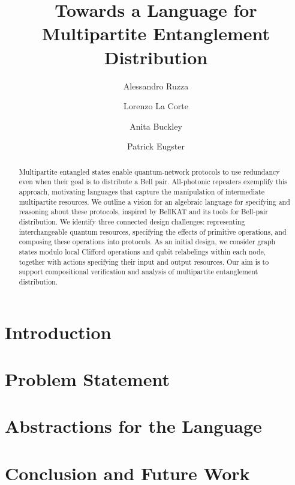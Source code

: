 \documentclass[acmsmall,11pt,screen,nonacm]{acmart}
\begin{document}
\title{Towards a Language for Multipartite Entanglement Distribution}

\author{Alessandro Ruzza}
\author{Lorenzo La Corte}
\author{Anita Buckley}
\author{Patrick Eugster}

\begin{abstract}
Multipartite entangled states enable quantum-network protocols to use redundancy even when their goal is to distribute a Bell pair. All-photonic repeaters exemplify this approach, motivating languages that capture the manipulation of intermediate multipartite resources. We outline a vision for an algebraic language for specifying and reasoning about these protocols, inspired by BellKAT and its tools for Bell-pair distribution. We identify three connected design challenges: representing interchangeable quantum resources, specifying the effects of primitive operations, and composing these operations into protocols. As an initial design, we consider graph states modulo local Clifford operations and qubit relabelings within each node, together with actions specifying their input and output resources. Our aim is to support compositional verification and analysis of multipartite entanglement distribution.
\end{abstract}


\maketitle

\section{Introduction}
\label{sec:introduction}



\section{Problem Statement}
\label{sec:problem}


\section{Abstractions for the Language}
\label{sec:abstractions}



\section{Conclusion and Future Work}
\label{sec:conclusion}





\end{document}
